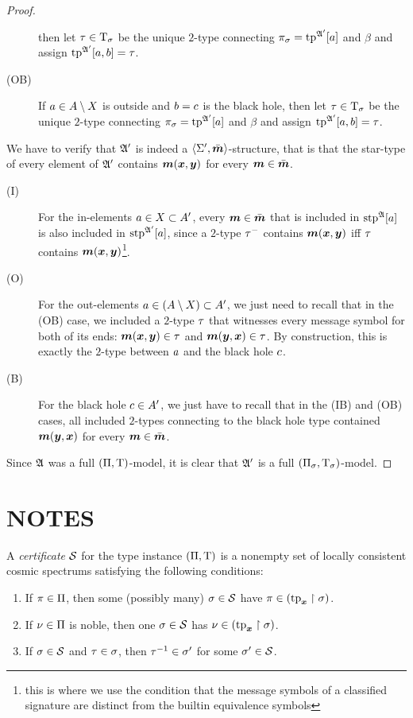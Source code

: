 \begin{proof}
\begin{description}
  then let $\tau \in \mathrm{T}_\sigma$ be the unique $2$-type connecting $\pi_\sigma =
  \operatorname{tp}^{\mathfrak{A'}}[a]$ and $\beta$ and assign $\operatorname{tp}^{\mathfrak{A'}}[a,b] = \tau$.
  \item[(OB)] If $a \in A \setminus X$ is outside and $b = c$ is the
  black hole, then let $\tau \in \mathrm{T}_\sigma$ be the unique $2$-type connecting
  $\pi_\sigma = \operatorname{tp}^{\mathfrak{A'}}[a]$ and $\beta$ and assign $\operatorname{tp}^{\mathfrak{A'}}[a,b] =
  \tau$.
\end{description}
We have to verify that $\mathfrak{A'}$ is indeed a $\left\langle \mathrm{\Sigma'},\bar{\bm{m}} \right\rangle$-structure, that
is that the star-type of every element of $\mathfrak{A'}$ contains $\bm{m}(\bm{x},\bm{y})$ for
every $\bm{m} \in \bar{\bm{m}}$. 
\begin{description}
\item[(I)] For the in-elements $a \in X \subset A'$, every
$\bm{m} \in \bar{\bm{m}}$ that is included in $\operatorname{stp}^{\mathfrak{A}}[a]$ is also included in
$\operatorname{stp}^{\mathfrak{A'}}[a]$, since a $2$-type $\tau^{-}$ contains $\bm{m}(\bm{x},\bm{y})$ iff
$\tau$ contains $\bm{m}(\bm{x},\bm{y})$\footnote{this is where we use the condition
that the message symbols of a classified signature are distinct from the
builtin equivalence symbols}.
\item[(O)] For the out-elements $a \in (A \setminus X) \subset A'$, we
just need to recall that in the (OB) case, we included a $2$-type $\tau$ that
witnesses every message symbol for both of its ends: $\bm{m}(\bm{x},\bm{y}) \in \tau$
and $\bm{m}(\bm{y},\bm{x}) \in \tau$. By construction, this is exactly the $2$-type
between $a$ and the black hole $c$.
\item[(B)] For the black hole $c \in A'$, we just have to recall that in
the (IB) and (OB) cases, all included $2$-types connecting to the black hole
type contained $\bm{m}(\bm{y},\bm{x})$ for every $\bm{m} \in \bar{\bm{m}}$.
\end{description}
Since $\mathfrak{A}$ was a full $(\Pi,\mathrm{T})$-model, it is clear that $\mathfrak{A'}$ is a
full $(\Pi_\sigma,\mathrm{T}_\sigma)$-model.
\end{proof}
\section{NOTES}
\begin{definition}
A \emph{certificate} $\mathcal{S}$ for the type instance $(\Pi,\mathrm{T})$ is a
nonempty set of locally consistent cosmic spectrums satisfying the following
conditions:
\begin{enumerate}
  \item If $\pi \in \Pi$, then some (possibly many) $\sigma \in \mathcal{S}$ have
  $\pi \in (\operatorname{tp}_{\bm{x}}\restriction \sigma)$.
  \item If $\nu \in \Pi$ is noble, then one $\sigma \in \mathcal{S}$ has 
  $\nu \in (\operatorname{tp}_{\bm{x}}\restriction \sigma)$.
  \item If $\sigma \in \mathcal{S}$ and $\tau \in \sigma$,
  then $\tau^{-1} \in \sigma'$ for some $\sigma' \in \mathcal{S}$.
\end{enumerate}
\end{definition}

